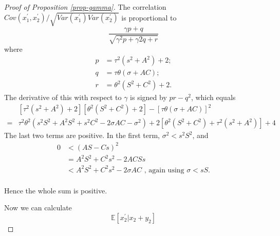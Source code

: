 \documentclass[
]{article}
\theoremstyle{definition}
\theoremstyle{definition}
\theoremstyle{definition}
\theoremstyle{definition}
\theoremstyle{remark}
\begin{document}
\begin{proof}[Proof of Proposition \ref{prop-gamma}]
The correlation $Cov(x_{1}^{\prime},x_{2}^{\prime})/\sqrt{Var(x_{1}^{\prime})Var(x_{2}^{\prime})}$
is proportional to
\[
\frac{\gamma p+q}{\sqrt{\gamma^{2}p+\gamma2q+r}}
\]
where 
\begin{align*}
p & =\tau^{2}(s^{2}+A^{2})+2;\\
q & =\tau\theta(\sigma+AC);\\
r & =\theta^{2}(S^{2}+C^{2})+2.
\end{align*}
The derivative of this with respect to $\gamma$ is signed by $pr-q^{2}$, 
which equals
\begin{align*}
 & [\tau^{2}(s^{2}+A^{2})+2][\theta^{2}(S^{2}+C^{2})+2]-[\tau\theta(\sigma+AC)]^{2}\\
= & \tau^{2}\theta^{2}(s^{2}S^{2}+A^{2}S^{2}+s^{2}C^{2}-2\sigma AC-\sigma^{2})+2[\theta^{2}(S^{2}+C^{2})+\tau^{2}(s^{2}+A^{2})]+4
\end{align*}
The last two terms are positive. In the first term, $\sigma^{2}<s^{2}S^{2}$,
and
\begin{align*}
0 & <(AS-Cs)^{2}\\
 & =A^{2}S^{2}+C^{2}s^{2}-2ACSs\\
 & <A^{2}S^{2}+C^{2}s^{2}-2\sigma AC\textrm{ , again using }\sigma<sS.\\
\end{align*}

Hence the whole sum is positive.


Now we can calculate
\[
\mathbb{E}[x_{2}^{\prime}|x_{2}+y_{2}]
\]


\end{proof}
\end{document}
